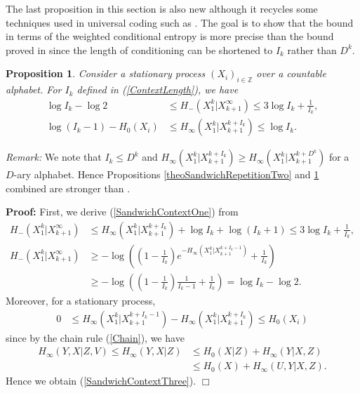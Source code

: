 \documentclass[a4paper,12pt]{article}
\newcommand{\okra}[1]{\left( #1 \right)}
\newtheorem{proposition}{Proposition}
\newenvironment*{proof}{\begin{trivlist}\item[]
\noindent\textbf{Proof:}}{$\Box$\par\end{trivlist}}
\begin{document}
The last proposition in this section is also new although it recycles
some techniques used in universal coding such as \citep[Theorem
6.11]{Debowski21}. The goal is to show that the bound in terms of the
weighted conditional entropy is more precise than the bound proved in
\citep[Theorem 8]{Debowski18b} since the length of conditioning can be
shortened to $I_k$ rather than $D^k$.
\begin{proposition}
  \label{theoSandwichContext}
  Consider a stationary process $(X_i)_{i\in\mathbb{Z}}$ over a
  countable alphabet.  For $I_k$ defined in (\ref{ContextLength}), we
  have
\begin{align}
  \label{SandwichContextOne}
  \log I_k-\log 2&\le H_-(X_1^k|X_{k+1}^\infty)\le
  3\log I_k+\frac{1}{I_k}
  ,
  \\
  \label{SandwichContextThree}
  \log (I_k-1)-H_0(X_i)&\le H_\infty(X_1^k|X_{k+1}^{k+I_k})\le \log I_k
                              .
\end{align}
\end{proposition}
\emph{Remark:} We note that $I_k\le D^k$ and
$H_\infty(X_1^k|X_{k+1}^{k+I_k})\ge H_\infty(X_1^k|X_{k+1}^{k+D^k})$
for a $D$-ary alphabet. Hence Propositions
\ref{theoSandwichRepetitionTwo} and \ref{theoSandwichContext} combined
are stronger than \citep[Theorem 8]{Debowski18b}.
\begin{proof}
First, we derive (\ref{SandwichContextOne}) from
\begin{align}
  H_-(X_1^k|X_{k+1}^\infty)
  &\le
    H_\infty(X_1^k|X_{k+1}^{k+I_k})+\log I_k+\log (I_k+1)\le
    3\log I_k+\frac{1}{I_k},
  \\
  H_-(X_1^k|X_{k+1}^\infty)
  &\ge
    -\log\okra{\okra{1-\frac{1}{I_k}}e^{-H_\infty(X_1^k|X_{k+1}^{k+I_k-1})}
    +\frac{1}{I_k}}
    \nonumber\\
  &\ge -\log\okra{\okra{1-\frac{1}{I_k}}\frac{1}{I_k-1}+\frac{1}{I_k}}
    =\log I_k-\log 2.
\end{align}
Moreover, for a stationary process,
\begin{align}
  0
  &\le
    H_\infty(X_1^k|X_{k+1}^{k+I_k-1})-H_\infty(X_1^k|X_{k+1}^{k+I_k})\le
    H_0(X_i)
\end{align}
since by the chain rule (\ref{Chain}), we have
\begin{align}
  H_\infty(Y,X|Z,V)\le H_\infty(Y,X|Z)
  &\le H_0(X|Z)+H_\infty(Y|X,Z)
    \nonumber\\
  &\le H_0(X)+H_\infty(U,Y|X,Z). 
\end{align}
Hence we obtain (\ref{SandwichContextThree}).
\end{proof}
\end{document}
